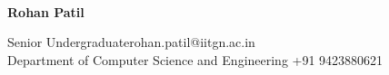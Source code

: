 \documentclass[a4paper,10pt]{awesome-iitgncv}
\begin{document}
\hspace{0.5cm}\\[-0.2cm]
\setlength{\columnsep}{4cm}
\begin{large}
\indent\textbf{Rohan Patil} \\
\end{large}
 \indent Senior Undergraduate\hfill rohan.patil@iitgn.ac.in \\
 \indent Department of Computer Science and Engineering  \hfill +91 9423880621









\end{document}
